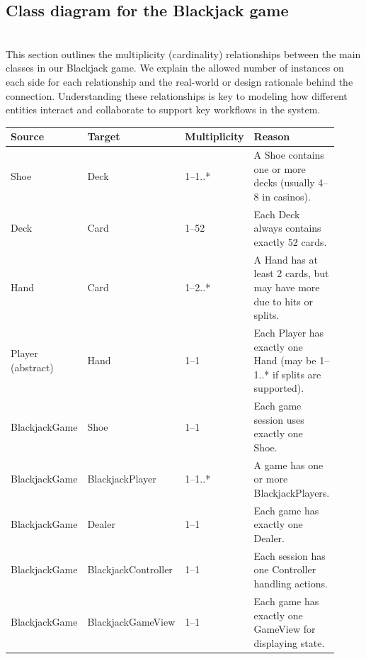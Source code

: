 \subsection{Class diagram for the Blackjack game}\label{bstILSbPAlow9Symxkzr6}
\\
This section outlines the multiplicity (cardinality) relationships between the main classes in our Blackjack game. We explain the allowed number of instances on each side for each relationship and the real-world or design rationale behind the connection. Understanding these relationships is key to modeling how different entities interact and collaborate to support key workflows in the system.

\begin{center}
\begin{tabular}{|p{0.22\linewidth}|p{0.22\linewidth}|p{0.18\linewidth}|p{0.30\linewidth}|}
\hline
\textbf{Source} & \textbf{Target} & \textbf{Multiplicity} & \textbf{Reason} \\
\hline

Shoe & Deck & 1--1..* & A Shoe contains one or more decks (usually 4–8 in casinos). \\
\hline

Deck & Card & 1--52 & Each Deck always contains exactly 52 cards. \\
\hline

Hand & Card & 1--2..* & A Hand has at least 2 cards, but may have more due to hits or splits. \\
\hline

Player (abstract) & Hand & 1--1 & Each Player has exactly one Hand (may be 1--1..* if splits are supported). \\
\hline

BlackjackGame & Shoe & 1--1 & Each game session uses exactly one Shoe. \\
\hline

BlackjackGame & BlackjackPlayer & 1--1..* & A game has one or more BlackjackPlayers. \\
\hline

BlackjackGame & Dealer & 1--1 & Each game has exactly one Dealer. \\
\hline

BlackjackGame & BlackjackController & 1--1 & Each session has one Controller handling actions. \\
\hline

BlackjackGame & BlackjackGameView & 1--1 & Each game has exactly one GameView for displaying state. \\
\hline

\end{tabular}
\end{center}


